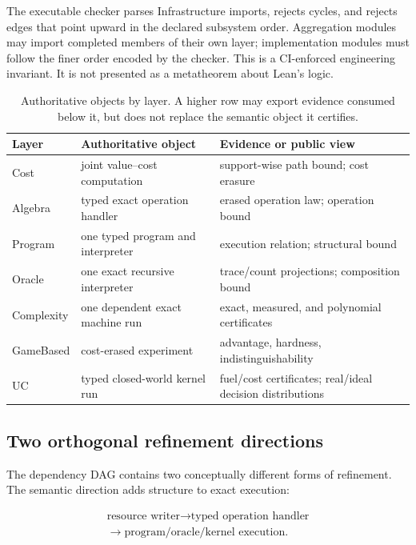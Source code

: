 The executable checker
 parses Infrastructure imports,
rejects cycles, and rejects edges that point upward in the declared subsystem
order.  Aggregation modules may import completed members of their own layer;
implementation modules must follow the finer order encoded by the checker.
This is a CI-enforced engineering invariant.  It is not presented as a
metatheorem about Lean's logic.

\begin{table}[t]
  \centering
  \caption{Authoritative objects by layer.  A higher row may export evidence
    consumed below it, but does not replace the semantic object it certifies.}
  \label{tab:layer-objects}
  \small
  \begin{tabular}{@{}>{\raggedright\arraybackslash}p{.20\linewidth}
      >{\raggedright\arraybackslash}p{.38\linewidth}
      >{\raggedright\arraybackslash}p{.34\linewidth}@{}}
    \toprule
    Layer & Authoritative object & Evidence or public view \\
    \midrule
    Cost & joint value--cost computation & support-wise path bound; cost erasure \\
    Algebra & typed exact operation handler & erased operation law; operation bound \\
    Program & one typed program and interpreter & execution relation; structural bound \\
    Oracle & one exact recursive interpreter & trace/count projections; composition bound \\
    Complexity & one dependent exact machine run & exact, measured, and polynomial certificates \\
    GameBased & cost-erased experiment & advantage, hardness, indistinguishability \\
    UC & typed closed-world kernel run & fuel/cost certificates; real/ideal decision distributions \\
    \bottomrule
  \end{tabular}
\end{table}

\subsection{Two orthogonal refinement directions}

The dependency DAG contains two conceptually different forms of refinement.
The semantic direction adds structure to exact execution:

\[
  \begin{gathered}
    \text{resource writer}\longrightarrow\text{typed operation handler}
    \\
    \longrightarrow\text{program/oracle/kernel execution}.
  \end{gathered}
\]

